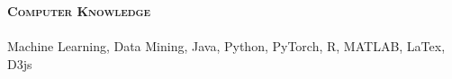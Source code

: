 \documentclass[11pt]{article}
\makeatletter
\newcommand{\lineunder}{\vspace*{-8pt} \\ \hspace*{-18pt} \hrulefill \\}
\newcommand{\header}[1]{{\hspace*{-15pt}\vspace*{6pt} \large \textsc{\textbf{#1}}} \vspace*{-6pt} \lineunder}
\newenvironment{achievements}{\begin{list}{$\bullet$}{\topsep 0pt \itemsep -2pt}}{\vspace*{4pt}\end{list}}
\newcommand{\headerrow}[2]
{\begin{tabular*}{\linewidth}{l@{\extracolsep{\fill}}r}
	\hspace*{-15pt}#1 & #2 \\
\end{tabular*}}
\newcommand{\CPP}
 {C\nolinebreak[4]\hspace{-.05em}\raisebox{.22ex}{\footnotesize\bf ++}}
\makeatother
\begin{document}




\vspace*{1.5pt}
\header{Computer Knowledge}
Machine Learning, Data Mining, Java, Python, PyTorch, R, MATLAB, LaTex, D3js
\end{document}
